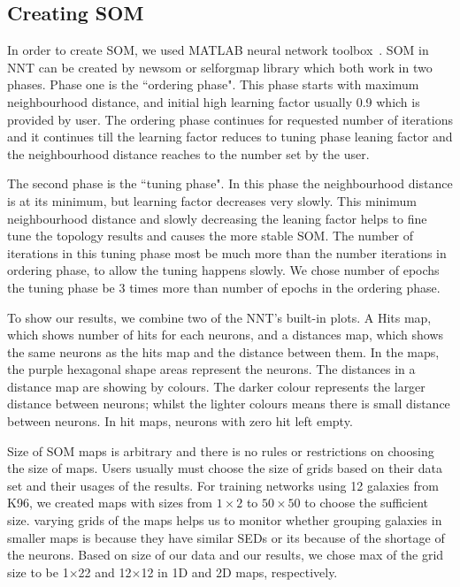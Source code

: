 \subsection{Creating SOM}
\label{sec: create_som}
     In order to create SOM, we used {\tiny MATLAB} neural network toolbox~\citep[NNT,][]{matlabtolbox}.
     SOM in {\tiny NNT} can be created by {\tiny newsom} or {\tiny selforgmap} library which both work in two phases. 
     Phase one is the ``ordering phase". 
     This phase starts with maximum neighbourhood distance, and initial high learning factor usually 0.9 which is provided by user. 
     The ordering phase continues for requested number of iterations and it continues till the learning factor reduces to tuning phase leaning factor and the neighbourhood distance reaches to the number set by the user.
     
     The second phase is the ``tuning phase".
     In this phase the neighbourhood distance is at its minimum, but learning factor decreases very slowly.
     This minimum neighbourhood distance and slowly decreasing the leaning factor helps to fine tune the topology results and causes the more stable SOM. 
     The number of iterations in this tuning phase most be much more than the number iterations in ordering phase, to allow the tuning happens slowly. 
     We chose number of epochs the tuning phase be 3 times more than number of epochs in the ordering phase.
     
     To show our results, we combine two of the {\tiny NNT}'s built-in plots. 
     A Hits map, which shows number of hits for each neurons, and a distances map, which shows the same neurons as the hits map and the distance between them. 
     In the maps, the purple hexagonal shape areas represent the neurons.
     The distances in a distance map are showing by colours.
     The darker colour represents the larger distance between neurons; whilst the lighter colours means there is small distance between neurons.
     In hit maps, neurons with zero hit left empty.
      
    
     Size of SOM maps is arbitrary and there is no rules or restrictions on choosing the size of maps. 
     Users usually must choose the size of grids based on their data set and their usages of the results.
     For training networks using 12 galaxies from K96, we created maps with sizes from $1\times2$ to $50\times50$ to choose the sufficient size.
     varying grids of the maps helps us to monitor whether grouping galaxies in smaller maps is because they have similar SEDs or its because of the shortage of the neurons.
     Based on size of our data and our results, we chose max of the grid size to be 1$\times$22 and 12$\times$12 in 1D and 2D maps, respectively. 
     
